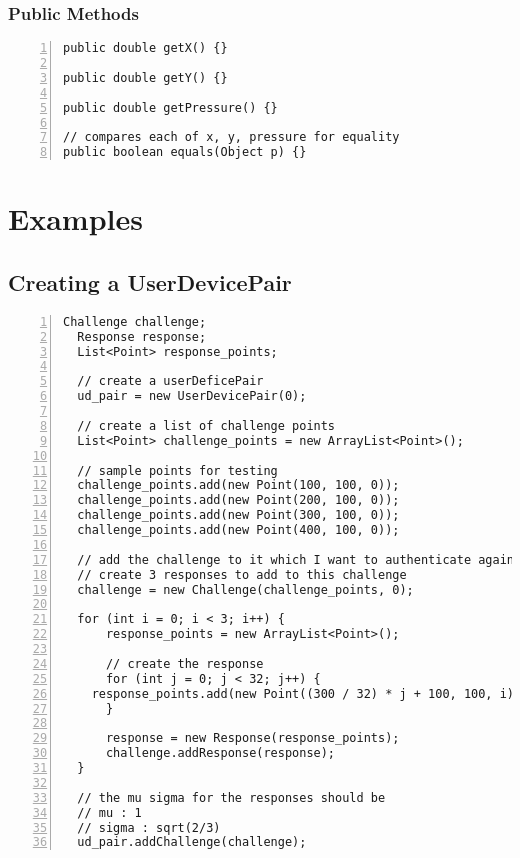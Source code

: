 \documentclass{article} %
\begin{document}
\subsubsection{Public Methods}
\begin{lstlisting}[numbers=left]
public double getX() {}

public double getY() {}

public double getPressure() {}
    
// compares each of x, y, pressure for equality
public boolean equals(Object p) {}
\end{lstlisting}

\section{Examples}
\subsection{Creating a UserDevicePair}

\begin{lstlisting}[numbers=left]
  Challenge challenge;
  Response response;
  List<Point> response_points;

  // create a userDeficePair
  ud_pair = new UserDevicePair(0);

  // create a list of challenge points
  List<Point> challenge_points = new ArrayList<Point>();

  // sample points for testing
  challenge_points.add(new Point(100, 100, 0));
  challenge_points.add(new Point(200, 100, 0));
  challenge_points.add(new Point(300, 100, 0));
  challenge_points.add(new Point(400, 100, 0));

  // add the challenge to it which I want to authenticate against
  // create 3 responses to add to this challenge
  challenge = new Challenge(challenge_points, 0);

  for (int i = 0; i < 3; i++) {
      response_points = new ArrayList<Point>();

      // create the response
      for (int j = 0; j < 32; j++) {
    response_points.add(new Point((300 / 32) * j + 100, 100, i));
      }

      response = new Response(response_points);
      challenge.addResponse(response);
  }

  // the mu sigma for the responses should be
  // mu : 1
  // sigma : sqrt(2/3)
  ud_pair.addChallenge(challenge);
\end{lstlisting}
\end{document}
